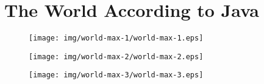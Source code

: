 \documentclass[8pt, a4paper, oneside]{extarticle}
\begin{document}
\section{The World According to Java}

\begin{figure}[!ht]
  \centering
  \texttt{[image: img/world-max-1/world-max-1.eps]}
\end{figure}
\begin{figure}[!ht]
  \centering
  \begin{minipage}{.5\textwidth}
    \centering
    \texttt{[image: img/world-max-2/world-max-2.eps]}
  \end{minipage}%
  \begin{minipage}{.5\textwidth}
    \centering
    \texttt{[image: img/world-max-3/world-max-3.eps]}
  \end{minipage}
\end{figure}
\end{document}
